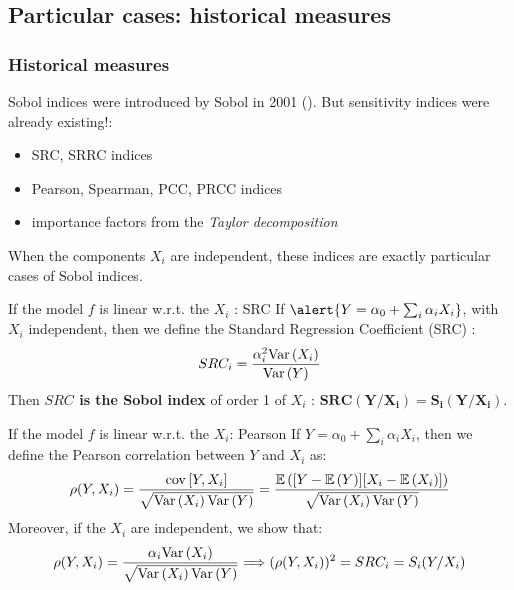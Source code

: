 \documentclass[8pt]{beamer}
\begin{document}
\subsection{Particular cases: historical measures}

\begin{frame}
\frametitle{Historical measures}
 \small
 
 Sobol indices  were introduced by Sobol in 2001 (\cite{Sobol2001}). But sensitivity indices were already existing!:
 \begin{itemize}
  \item SRC, SRRC indices
  \item Pearson, Spearman, PCC, PRCC indices
  \item importance factors from the \emph{Taylor decomposition}
 \end{itemize}
\alert{When the components $X_i$ are independent, these indices are exactly particular cases of Sobol indices.}

 \begin{block}{If the model $f$ is linear  w.r.t. the  $X_i$ : SRC}
  If $\alert{Y = \alpha_0 + \sum_i \alpha_i X_i}$, with \alert{ $X_i$ independent}, then we define the  \alert{ Standard Regression Coefficient (SRC)} :
    \begin{equation}
      SRC_i = \displaystyle \frac{\alpha_i^2 \mbox{Var}\left( X_i \right)}{\mbox{Var}\left( Y \right)}
    \end{equation}
    Then {\bf $SRC $ is the Sobol index} of order 1 of $X_i$ : $\boldsymbol{    SRC (Y / X_i) = S_i(Y / X_i)}$.
 \end{block}

 
\begin{block}{If the model $f$ is linear  w.r.t. the  $X_i$: Pearson}
 If  \alert{$Y=\alpha_0 + \sum_i \alpha_i X_i$}, then we define the \alert{ Pearson correlation} between $Y$ and $X_i$ as:
   \begin{equation}
    \rho(Y,X_i) =  \dfrac{{\rm cov}\left[Y,X_i \right]}{\sqrt{\mbox{Var}\left( X_i \right)\mbox{Var}\left( Y \right)}} = \dfrac{\mathbb{E}\left( [Y-\mathbb{E}\left( Y \right)][X_i - \mathbb{E}\left( X_i \right)] \right)}{\sqrt{\mbox{Var}\left( X_i \right)\mbox{Var}\left( Y \right)}}
  \end{equation}
Moreover, if the  \alert{ $X_i$ are independent}, we show that:
  $$
  \rho(Y,X_i) = \dfrac{\alpha_i \mbox{Var}\left( X_i \right)}{\sqrt{\mbox{Var}\left( X_i \right)\mbox{Var}\left( Y \right)}} \Longrightarrow (\rho(Y,X_i))^2 = SRC_i = S_i(Y/X_i)
  $$
  \end{block}
\end{frame}
 
\end{document}
